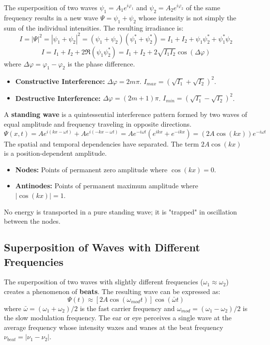 \begin{theorem}[Interference]
The superposition of two waves $\psi_1 = A_1 e^{i\varphi_1}$ and $\psi_2 = A_2 e^{i\varphi_2}$ of the same frequency results in a new wave $\Psi = \psi_1 + \psi_2$ whose intensity is not simply the sum of the individual intensities. The resulting irradiance is:
$$ I = |\Psi|^2 = |\psi_1 + \psi_2|^2 = (\psi_1 + \psi_2)(\psi_1^* + \psi_2^*) = I_1 + I_2 + \psi_1\psi_2^* + \psi_1^*\psi_2 $$
$$ I = I_1 + I_2 + 2\Re(\psi_1\psi_2^*) = I_1 + I_2 + 2\sqrt{I_1 I_2}\cos(\Delta\varphi) $$
where $\Delta\varphi = \varphi_1 - \varphi_2$ is the phase difference.
\begin{itemize}
    \item \textbf{Constructive Interference:} $\Delta\varphi = 2m\pi$. $I_{max} = (\sqrt{I_1}+\sqrt{I_2})^2$.
    \item \textbf{Destructive Interference:} $\Delta\varphi = (2m+1)\pi$. $I_{min} = (\sqrt{I_1}-\sqrt{I_2})^2$.
\end{itemize}
\end{theorem}

\begin{definition}
A \textbf{standing wave} is a quintessential interference pattern formed by two waves of equal amplitude and frequency traveling in opposite directions.
$$ \Psi(x,t) = A e^{i(kx-\omega t)} + A e^{i(-kx-\omega t)} = A e^{-i\omega t}(e^{ikx} + e^{-ikx}) = (2A\cos(kx))e^{-i\omega t} $$
The spatial and temporal dependencies have separated. The term $2A\cos(kx)$ is a position-dependent amplitude.
\begin{itemize}
    \item \textbf{Nodes:} Points of permanent zero amplitude where $\cos(kx)=0$.
    \item \textbf{Antinodes:} Points of permanent maximum amplitude where $|\cos(kx)|=1$.
\end{itemize}
No energy is transported in a pure standing wave; it is "trapped" in oscillation between the nodes.
\end{definition}

\subsection{Superposition of Waves with Different Frequencies}

\begin{proposition}[Beats]
The superposition of two waves with slightly different frequencies ($\omega_1 \approx \omega_2$) creates a phenomenon of \textbf{beats}. The resulting wave can be expressed as:
$$ \Psi(t) \approx \left[ 2A \cos(\omega_{mod}t) \right] \cos(\bar{\omega}t) $$
where $\bar{\omega} = (\omega_1+\omega_2)/2$ is the fast carrier frequency and $\omega_{mod} = (\omega_1-\omega_2)/2$ is the slow modulation frequency. The ear or eye perceives a single wave at the average frequency whose intensity waxes and wanes at the beat frequency $\nu_{beat} = |\nu_1 - \nu_2|$.
\end{proposition}


